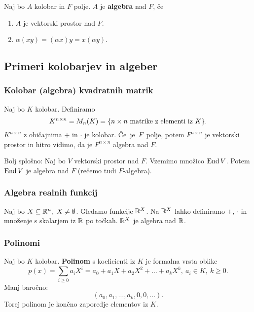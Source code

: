 \begin{definicija}
    Naj bo $A$ kolobar in $F$ polje. $A$ je \textbf{algebra} nad $F$, če 
    \begin{enumerate}
        \item $A$ je vektorski prostor nad $F$.
        \item $\alpha(xy) = (\alpha x)y = x(\alpha y)$.
    \end{enumerate}
\end{definicija}

\subsection{Primeri kolobarjev in algeber}
\subsubsection*{Kolobar (algebra) kvadratnih matrik}
Naj bo $K$ kolobar. Definiramo $$K^{n \times n} = M_n(K) = \{n \times n \text{ matrike z elementi iz } K\}.$$ $K^{n \times n}$ z običajnima $+$ in $\cdot$ je kolobar. Če~je~$F$~polje, potem $F^{n \times n}$ je vektorski prostor in hitro vidimo, da je $F^{n \times n}$ algebra nad $F$.

Bolj splošno: Naj bo $V$ vektorski prostor nad $F$. Vzemimo množico $\operatorname{End} V$. Potem $\operatorname{End} V$ je algebra nad $F$ (rečemo tudi $F$-algebra).

\subsubsection*{Algebra realnih funkcij}
Naj bo $X \subseteq \mathbb{R}^n, \ X \neq \emptyset$. Gledamo funkcije $\mathbb{R}^X$. Na $\mathbb{R}^X$ lahko definiramo $+$, $\cdot$ in množenje s skalarjem iz $\mathbb{R}$ po točkah. $\mathbb{R}^X$ je algebra nad $\mathbb{R}$.

\subsubsection*{Polinomi}
Naj bo $K$ kolobar. \textbf{Polinom} s koeficienti iz $K$ je formalna vrsta oblike
$$p(x) = \sum_{i \geq 0} a_iX^i = a_0 + a_1X + a_2 X^2 + \ldots + a_k X^k, \ a_i \in K, \ k \geq 0.$$
Manj baročno:
$$(a_0, a_1, \ldots, a_k, 0, 0, \ldots).$$
Torej polinom je končno zaporedje elementov iz $K$.

